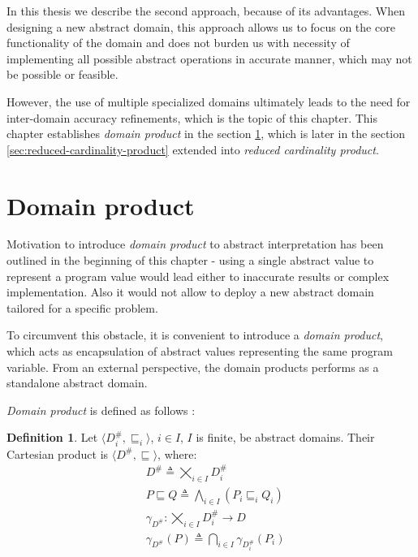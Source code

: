 \documentclass[12pt,oneside]{fithesis2}
\theoremstyle{definition}
\newtheorem{definition}{Definition}
\begin{document}
\vspace{1.5\baselineskip} %

In this thesis we describe the second approach, because of its advantages. When designing a new abstract domain, this approach allows us to focus on the core functionality of the domain and does not burden us with necessity of implementing all possible abstract operations in accurate manner, which may not be possible or feasible.

However, the use of multiple specialized domains ultimately leads to the need for inter-domain accuracy refinements, which is the topic of this chapter. This chapter establishes \textit{domain product} in the section \ref{sec:domain-product}, which is later in the section \ref{sec:reduced-cardinality-product} extended into \textit{reduced cardinality product}.

\section{Domain product}\label{sec:domain-product}

Motivation to introduce \textit{domain product} to abstract interpretation has been outlined in the beginning of this chapter - using a single abstract value to represent a program value would lead either to inaccurate results or complex implementation. Also it would not allow to deploy a new abstract domain tailored for a specific problem. \cite{CousotEtAl06-ASIAN}

To circumvent this obstacle, it is convenient to introduce a \textit{domain product}, which acts as encapsulation of abstract values representing the same program variable. From an external perspective, the domain products performs as a standalone abstract domain.

\textit{Domain product} is defined as follows \cite{CousotCousotMauborgne-FoSSaCS-11}:

\begin{definition}
  Let $\langle D^\#_i, \sqsubseteq_i \rangle$, $i \in I$, $I$ is finite, be abstract domains. Their Cartesian product is $\langle D^\#, \sqsubseteq \rangle$, where:
  \begin{align*}
    &D^\# \triangleq \bigtimes_{i \in I} D^\#_i\\
    &P \sqsubseteq Q \triangleq \bigwedge_{i \in I}\left(P_i \sqsubseteq_i Q_i \right)\\
    &\gamma_{D^\#}: \bigtimes_{i \in I} D^\#_i \to D\\
    &\gamma_{D^\#}(P) \triangleq \bigcap_{i \in I} \gamma_{D^\#_i}\left( P_i \right)
  \end{align*}
\end{definition}
\end{document}
